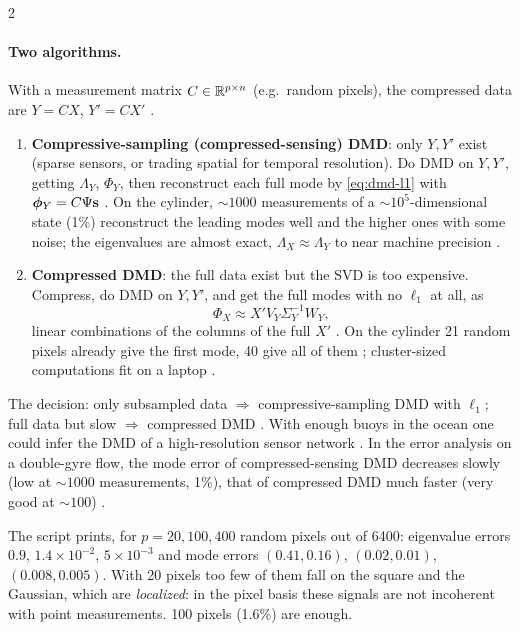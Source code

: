 \begin{paracol}{2}
\paragraph{Two algorithms.} With a measurement matrix $C\in\mathbb{R}^{p\times n}$ (e.g.\ random pixels), the
compressed data are $Y=CX$, $Y'=CX'$ .
\begin{enumerate}
  \item \textbf{Compressive-sampling (compressed-sensing) DMD}: only $Y,Y'$ exist (sparse sensors, or
        trading spatial for temporal resolution). Do DMD on $Y,Y'$, getting $\Lambda_Y$, $\Phi_Y$, then
        reconstruct each full mode by \eqref{eq:dmd-l1} with $\boldsymbol\phi_Y=C\Psi\mathbf{s}$
        . On the cylinder, $\sim1000$ measurements of a $\sim10^5$-dimensional state (1\%)
        reconstruct the leading modes well and the higher ones with some noise; the eigenvalues are almost
        exact, $\Lambda_X\approx\Lambda_Y$ to near machine precision .
  \item \textbf{Compressed DMD}: the full data exist but the SVD is too expensive. Compress, do DMD on
        $Y,Y'$, and get the full modes with no $\ell_1$ at all, as
        \begin{equation}\label{eq:dmd-cdmd}
          \Phi_X\approx X'V_Y\Sigma_Y^{-1}W_Y ,
        \end{equation}
        linear combinations of the columns of the full $X'$ . On the cylinder
        21 random pixels already give the first mode, 40 give all of them ; cluster-sized
        computations fit on a laptop .
\end{enumerate}
The decision: only subsampled data $\Rightarrow$ compressive-sampling DMD with $\ell_1$; full data but slow
$\Rightarrow$ compressed DMD . With enough buoys in the ocean one could
infer the DMD of a high-resolution sensor network . In the error analysis on a double-gyre
flow, the mode error of compressed-sensing DMD decreases slowly (low at $\sim1000$ measurements, 1\%),
that of compressed DMD much faster (very good at $\sim100$) .


The script prints, for $p=20,100,400$ random pixels out of 6400: eigenvalue errors $0.9$,
$1.4\times10^{-2}$, $5\times10^{-3}$ and mode errors $(0.41,0.16)$, $(0.02,0.01)$, $(0.008,0.005)$. With 20
pixels too few of them fall on the square and the Gaussian, which are \emph{localized}: in the pixel basis
these signals are not incoherent with point measurements. 100 pixels (1.6\%) are enough.


\end{paracol}
